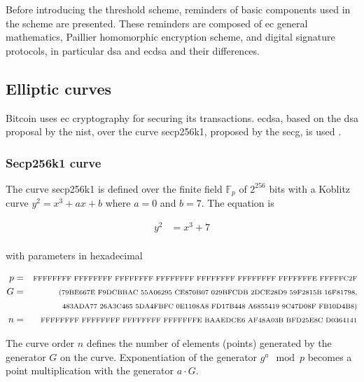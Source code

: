 Before introducing the threshold scheme, reminders of basic components used in
the scheme are presented. These reminders are composed of \gls{ec} general
mathematics, Paillier homomorphic encryption scheme, and digital signature
protocols, in particular \gls{dsa} and \gls{ecdsa} and their differences.

\subsection{Elliptic curves}

Bitcoin uses \gls{ec} cryptography for securing its transactions. \gls{ecdsa},
based on the \gls{dsa} proposal by the \gls{nist}, over the curve secp256k1,
proposed by the \gls{secg}, is used \cite{sec2}.

\subsubsection{Secp256k1 curve}

The curve secp256k1 is defined over the finite field $\mathbb{F}_p$ of $2^{256}$
bits with a Koblitz curve $y^2 = x^3 + ax + b$ where $a = 0$ and $b = 7$. The
equation is

\begin{equation*}
\begin{split}
  y^2 &= x^3 + 7\\
\end{split}
\end{equation*}

with parameters in hexadecimal

\begin{equation*}
\begin{split}
  p &= &\text{\scriptsize FFFFFFFF FFFFFFFF FFFFFFFF FFFFFFFF FFFFFFFF FFFFFFFF FFFFFFFE FFFFFC2F}\\
  G &= &\text{\scriptsize (79BE667E F9DCBBAC 55A06295 CE870B07 029BFCDB 2DCE28D9 59F2815B 16F81798,}\\
    &  &\text{\scriptsize  483ADA77 26A3C465 5DA4FBFC 0E1108A8 FD17B448 A6855419 9C47D08F FB10D4B8)}\\
  n &= &\text{\scriptsize FFFFFFFF FFFFFFFF FFFFFFFF FFFFFFFE BAAEDCE6 AF48A03B BFD25E8C D0364141}
\end{split}
\end{equation*}

The curve order $n$ defines the number of elements (points) generated by the
generator $G$ on the curve. Exponentiation of the generator $g^a \mod p$ becomes
a point multiplication with the generator $a \cdot G$.

